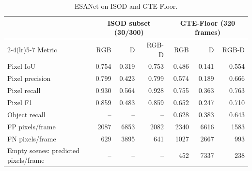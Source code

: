 \begin{table}[!b]
\caption{ESANet on ISOD and GTE-Floor.}
\label{tab:domain-results}
\centering\footnotesize
\begin{tabular}{lrrrrrr}
\toprule
& \multicolumn{3}{c}{ISOD subset (30/300)} & \multicolumn{3}{c}{GTE-Floor (320 frames)}\\
\cmidrule(lr){2-4}\cmidrule(lr){5-7}
Metric & RGB & D & RGB-D & RGB & D & RGB-D\\
\midrule
Pixel IoU & 0.754 & 0.319 & 0.753 & 0.486 & 0.141 & 0.554\\
Pixel precision & 0.799 & 0.423 & 0.799 & 0.574 & 0.189 & 0.666\\
Pixel recall & 0.930 & 0.564 & 0.928 & 0.755 & 0.363 & 0.763\\
Pixel F1 & 0.859 & 0.483 & 0.859 & 0.652 & 0.247 & 0.710\\
Object recall & -- & -- & -- & 0.628 & 0.383 & 0.643\\
FP pixels/frame & 2087 & 6853 & 2082 & 2340 & 6616 & 1583\\
FN pixels/frame & 629 & 3895 & 641 & 1027 & 2667 & 993\\
Empty scenes: predicted pixels/frame & -- & -- & -- & 452 & 7337 & 238\\
\bottomrule
\end{tabular}\par{}
\end{table}
